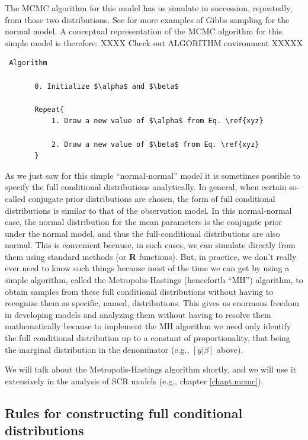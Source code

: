 The MCMC algorithm for this model has us simulate in succession,
repeatedly, from those two distributions. See \citet{gelman_etal:2004}
for more examples of Gibbs sampling for the normal model. A
conceptual representation of the MCMC algorithm for this simple model
is therefore:
XXXX Check out ALGORITHM environment XXXXX
\begin{verbatim}
 Algorithm

       0. Initialize $\alpha$ and $\beta$

       Repeat{
           1. Draw a new value of $\alpha$ from Eq. \ref{xyz}

           2. Draw a new value of $\beta$ from Eq. \ref{xyz}
       }
\end{verbatim}

As we just saw for this simple ``normal-normal'' model it is sometimes
possible to specify the full conditional distributions
analytically. In general, when certain so-called conjugate prior
distributions are chosen, the form of full conditional distributions
is similar to that of the observation model. In this normal-normal
case, the normal distribution for the mean parameters is the conjugate
prior under the normal model, and thus the full-conditional
distributions are also normal. This is convenient because, in such
cases, we can simulate directly from them using standard methods (or
{\bf R}
functions).  But, in practice, we don't really ever need to know such
things because most of the time we can get by using a simple
algorithm, called the Metropolis-Hastings (henceforth ``MH'')
algorithm, to obtain samples from these full conditional distributions
without having to recognize them as specific, named, distributions. 
This gives us enormous freedom in developing models
and analyzing them without having to resolve them mathematically
because to implement the MH algorithm we need only identify the full
conditional distribution up to a constant of proportionality, that
being the marginal distribution in the denominator (e.g., $[y|\beta]$
above).

We will talk about the Metropolis-Hastings algorithm shortly, and we
will use it extensively in the analysis of SCR models (e.g., chapter
\ref{chapt.mcmc}). 

\subsection{Rules for constructing full conditional distributions}  
\label{glms.sec.rules}

